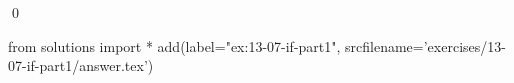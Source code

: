 
\begin{ex}
  \label{ex:13-07-if-part1}
  
  \qed
\end{ex}
\begin{python0}
from solutions import *
add(label="ex:13-07-if-part1",
    srcfilename='exercises/13-07-if-part1/answer.tex')
\end{python0}
